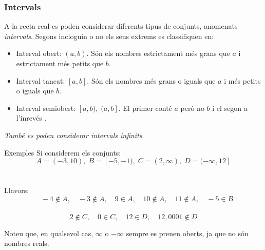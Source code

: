 \documentclass{beamer}
\begin{document}
\begin{frame}\frametitle{Intervals}
A la recta real es poden considerar diferents tipus de conjunts,
anome\-nats \emph{intervals}. Segons incloguin o no els seus
extrems es classifiquen en:\pause
%
\begin{itemize}
\item
Interval obert: $(a,b)$. Són els nombres estrictament més grans
que $a$ i estrictament més petits que $b$.\pause
\item
Interval tancat: $[a,b]$. Són els nombres més grans o iguals que
$a$ i més petits o iguals que $b$.\pause

\item
Interval semiobert: $[a,b), \; (a,b]$. El primer conté $a$ però no
$b$ i el segon a l'inrevés .
\end{itemize}\pause
\emph{També es poden considerar intervals infinits}.
\end{frame}
\begin{frame}
\begin{exampleblock}{Exemples}
Si considerem els conjunts: $$A=(-3, 10), \;B=[-5,-1), \;
C=(2,\infty), \; D=(-\infty,12]$$\\
$\;$\\
 Llavors: $$\quad-4\notin A,\quad
-3\notin A,\quad 9\in A,\quad 10\notin A,\quad 11\notin A,\quad
-5\in B$$\\
$$2\notin C,\quad 0\in C,\quad 12\in D,\quad 12,0001\notin D$$
\end{exampleblock}\pause
Noteu que, en qualsevol cas, $\infty$ o $-\infty$ sempre es prenen
oberts, ja que no són nombres reals.
\end{frame}
\end{document}
